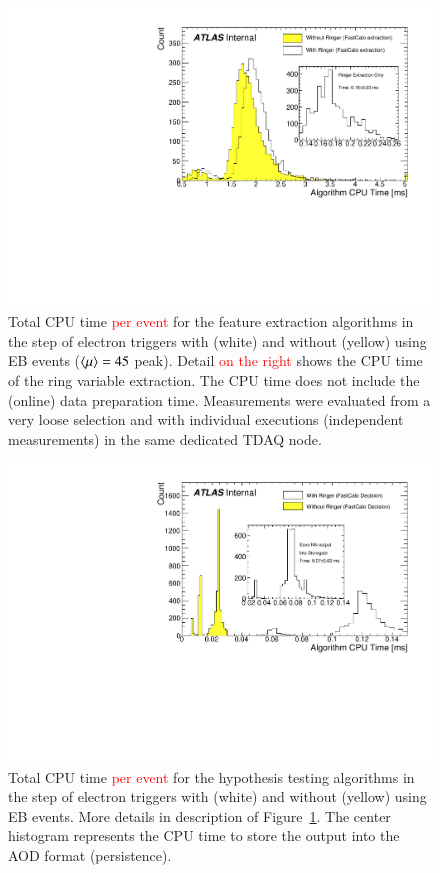 \begin{figure}[h!tb]
	\includegraphics[width=.7\textwidth]{sections/operation/figures/EgammaFex_TotalTime}
	\centering
	\caption{\label{fig:fastcalo_fex_time}
		Total CPU time \textcolor{red}{per event} for the feature extraction algorithms in
		the \fastcalo step of electron triggers with (white) and without (yellow) \rnn
		using EB events ($\langle \mu \rangle=45$ peak). Detail \textcolor{red}{on the right}
		shows the CPU time of the ring variable extraction. The CPU time does not
		include the (online) data preparation time.  Measurements were evaluated from 
		a very loose selection 
		and with individual executions (independent measurements) in the same dedicated
		TDAQ node.
	}
\end{figure}

\begin{figure}[h!tb]
	\includegraphics[width=.7\textwidth]{sections/operation/figures/EgammaHypo_TotalTime.pdf}
	\centering
	\caption{\label{fig:fastcalo_hypo_time}
		Total CPU time \textcolor{red}{per event} for the hypothesis testing algorithms
		in the \fastcalo step of electron triggers with (white) and without (yellow) \rnn
		using EB events. More details in description of Figure~\ref{fig:fastcalo_fex_time}. 
		The center histogram represents the CPU time to store the \rnn output into the AOD 
		format (persistence).}
\end{figure}


